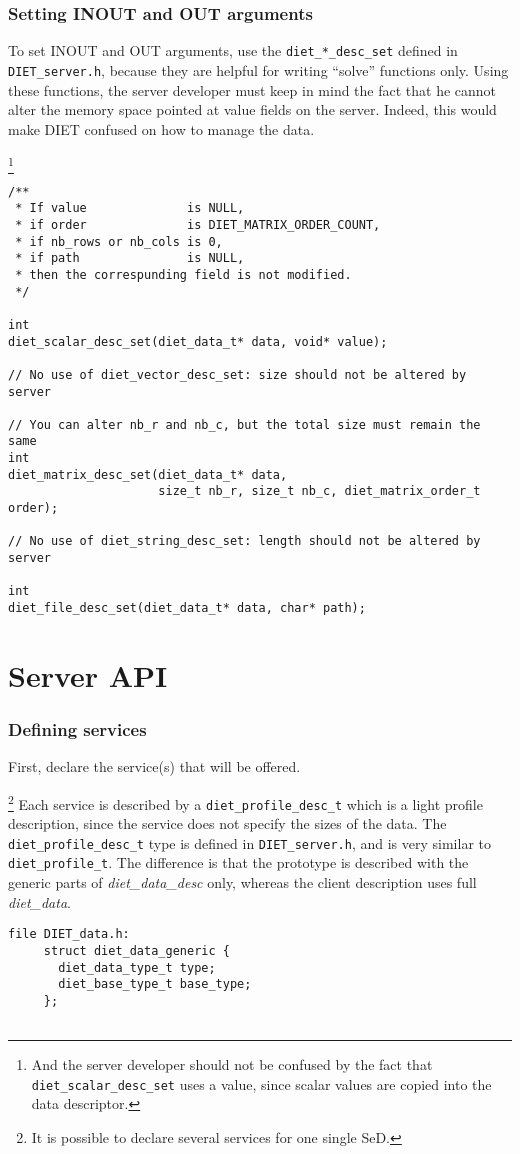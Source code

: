 \subsubsection*{Setting INOUT and OUT arguments}
To set INOUT and OUT arguments, use the \texttt{diet\_*\_desc\_set} defined in
\texttt{DIET\_server.h}, because they are helpful for writing ``solve''
functions only. Using these functions, the server developer must keep in mind
the fact that he cannot alter the memory space pointed at value fields on the
server. Indeed, this would make DIET confused on how to manage the
data.{\footnote{And the server developer should not be confused by the fact that
  \texttt{diet\_scalar\_desc\_set} uses a value, since scalar values are
  copied into the data descriptor.}
{\footnotesize
\begin{verbatim}
/**
 * If value              is NULL,
 * if order              is DIET_MATRIX_ORDER_COUNT,
 * if nb_rows or nb_cols is 0,
 * if path               is NULL,
 * then the correspunding field is not modified.
 */

int
diet_scalar_desc_set(diet_data_t* data, void* value);

// No use of diet_vector_desc_set: size should not be altered by server

// You can alter nb_r and nb_c, but the total size must remain the same
int
diet_matrix_desc_set(diet_data_t* data,
                     size_t nb_r, size_t nb_c, diet_matrix_order_t order);

// No use of diet_string_desc_set: length should not be altered by server

int
diet_file_desc_set(diet_data_t* data, char* path);
\end{verbatim}
}


\section{Server API}
\label{sec:svAPI}


\subsubsection*{Defining services}

First, declare the service(s) that will be offered.{\footnote{It is possible to
  declare several services for one single SeD.}
Each service is described by a \texttt{diet\_profile\_desc\_t} which is a light
profile description, since the service does not specify the sizes of the data.
The \texttt{diet\_profile\_desc\_t} type is defined in \texttt{DIET\_server.h},
and is very similar to \texttt{diet\_profile\_t}. The difference is that the
prototype is described with the generic parts of \emph{diet\_data\_desc} only,
whereas the client description uses full \emph{diet\_data}.
{\footnotesize
\begin{verbatim}
file DIET_data.h:
     struct diet_data_generic {
       diet_data_type_t type;
       diet_base_type_t base_type;
     };


\end{verbatim}}}}
